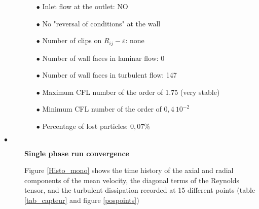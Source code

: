 \documentclass[a4paper,twoside,12pt]{article}
\begin{document}
\begin{description}
         \begin{itemize}
            \item[$\bullet$] Inlet flow at the outlet: NO
            \item[$\bullet$] No "reversal of conditions" at the wall
            \item[$\bullet$] Number of clips on $R_{ij}-\varepsilon$: none
            \item[$\bullet$] Number of wall faces in laminar flow: 0
            \item[$\bullet$] Number of wall faces in turbulent flow: 147
            \item[$\bullet$] Maximum CFL number of the order of 1.75 (very stable)
            \item[$\bullet$] Minimum CFL number of the order of $0,4~10^{-2}$
            \item[$\bullet$] Percentage of lost particles: $0,07$\%
         \end{itemize}

   \item[$\bullet$]\textbf{Single phase run convergence}

         Figure \ref{Histo_mono} shows the time history of the axial and radial components of the mean velocity, the diagonal terms of the Reynolds tensor, and the turbulent dissipation recorded at 15 different points (table \ref{tab_capteur} and figure \ref{pospoints})


\end{description}
\end{document}
